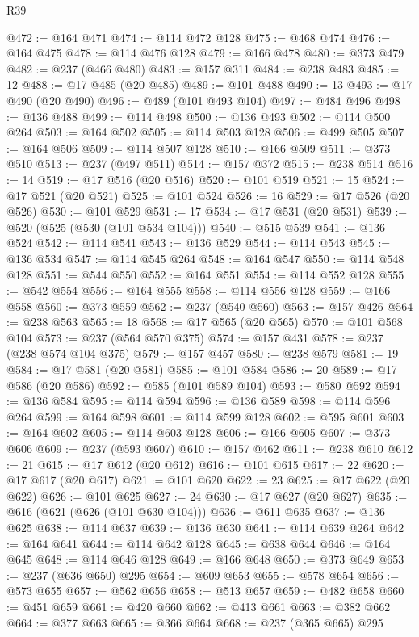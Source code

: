 \begin{lexlean}{R39}
\begin{coremodule}
@472 := @164 @471
@474 := @114 @472 @128
@475 := @468 @474
@476 := @164 @475
@478 := @114 @476 @128
@479 := @166 @478
@480 := @373 @479
@482 := @237 (@466 @480)
@483 := @157 @311
@484 := @238 @483
@485 := 12
@488 := @17 @485 (@20 @485)
@489 := @101 @488
@490 := 13
@493 := @17 @490 (@20 @490)
@496 := @489 (@101 @493 @104)
@497 := @484 @496
@498 := @136 @488
@499 := @114 @498
@500 := @136 @493
@502 := @114 @500 @264
@503 := @164 @502
@505 := @114 @503 @128
@506 := @499 @505
@507 := @164 @506
@509 := @114 @507 @128
@510 := @166 @509
@511 := @373 @510
@513 := @237 (@497 @511)
@514 := @157 @372
@515 := @238 @514
@516 := 14
@519 := @17 @516 (@20 @516)
@520 := @101 @519
@521 := 15
@524 := @17 @521 (@20 @521)
@525 := @101 @524
@526 := 16
@529 := @17 @526 (@20 @526)
@530 := @101 @529
@531 := 17
@534 := @17 @531 (@20 @531)
@539 := @520 (@525 (@530 (@101 @534 @104)))
@540 := @515 @539
@541 := @136 @524
@542 := @114 @541
@543 := @136 @529
@544 := @114 @543
@545 := @136 @534
@547 := @114 @545 @264
@548 := @164 @547
@550 := @114 @548 @128
@551 := @544 @550
@552 := @164 @551
@554 := @114 @552 @128
@555 := @542 @554
@556 := @164 @555
@558 := @114 @556 @128
@559 := @166 @558
@560 := @373 @559
@562 := @237 (@540 @560)
@563 := @157 @426
@564 := @238 @563
@565 := 18
@568 := @17 @565 (@20 @565)
@570 := @101 @568 @104
@573 := @237 (@564 @570 @375)
@574 := @157 @431
@578 := @237 (@238 @574 @104 @375)
@579 := @157 @457
@580 := @238 @579
@581 := 19
@584 := @17 @581 (@20 @581)
@585 := @101 @584
@586 := 20
@589 := @17 @586 (@20 @586)
@592 := @585 (@101 @589 @104)
@593 := @580 @592
@594 := @136 @584
@595 := @114 @594
@596 := @136 @589
@598 := @114 @596 @264
@599 := @164 @598
@601 := @114 @599 @128
@602 := @595 @601
@603 := @164 @602
@605 := @114 @603 @128
@606 := @166 @605
@607 := @373 @606
@609 := @237 (@593 @607)
@610 := @157 @462
@611 := @238 @610
@612 := 21
@615 := @17 @612 (@20 @612)
@616 := @101 @615
@617 := 22
@620 := @17 @617 (@20 @617)
@621 := @101 @620
@622 := 23
@625 := @17 @622 (@20 @622)
@626 := @101 @625
@627 := 24
@630 := @17 @627 (@20 @627)
@635 := @616 (@621 (@626 (@101 @630 @104)))
@636 := @611 @635
@637 := @136 @625
@638 := @114 @637
@639 := @136 @630
@641 := @114 @639 @264
@642 := @164 @641
@644 := @114 @642 @128
@645 := @638 @644
@646 := @164 @645
@648 := @114 @646 @128
@649 := @166 @648
@650 := @373 @649
@653 := @237 (@636 @650) @295
@654 := @609 @653
@655 := @578 @654
@656 := @573 @655
@657 := @562 @656
@658 := @513 @657
@659 := @482 @658
@660 := @451 @659
@661 := @420 @660
@662 := @413 @661
@663 := @382 @662
@664 := @377 @663
@665 := @366 @664
@668 := @237 (@365 @665) @295

\end{coremodule}
\end{lexlean}
